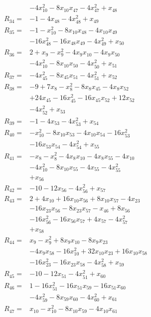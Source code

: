 \begin{align*}
&-4x_{10}^{2} -8x_{10}x_{47} -4x_{47}^{2} +x_{48}\\[3pt]
R_{34}={}&-1 -4x_{48} -4x_{48}^{2} +x_{49}\\[3pt]
R_{35}={}&-1 -x_{10}^{2} -8x_{10}x_{48} -4x_{10}x_{49}\\
&-16x_{48}^{2} -16x_{48}x_{49} -4x_{49}^{2} +x_{50}\\[3pt]
R_{36}={}&2 +x_{9} -x_{9}^{2} -4x_{9}x_{10} -4x_{9}x_{50}\\
&-4x_{10}^{2} -8x_{10}x_{50} -4x_{50}^{2} +x_{51}\\[3pt]
R_{37}={}&-4x_{45}^{2} -8x_{45}x_{51} -4x_{51}^{2} +x_{52}\\[3pt]
R_{38}={}&-9 +7x_{8} -x_{8}^{2} -8x_{8}x_{45} -4x_{8}x_{52}\\
&+24x_{45} -16x_{45}^{2} -16x_{45}x_{52} +12x_{52}\\
&-4x_{52}^{2} +x_{53}\\[3pt]
R_{39}={}&-1 -4x_{53} -4x_{53}^{2} +x_{54}\\[3pt]
R_{40}={}&-x_{10}^{2} -8x_{10}x_{53} -4x_{10}x_{54} -16x_{53}^{2}\\
&-16x_{53}x_{54} -4x_{54}^{2} +x_{55}\\[3pt]
R_{41}={}&-x_{8} -x_{8}^{2} -4x_{8}x_{10} -4x_{8}x_{55} -4x_{10}\\
&-4x_{10}^{2} -8x_{10}x_{55} -4x_{55} -4x_{55}^{2}\\
&+x_{56}\\[3pt]
R_{42}={}&-10 -12x_{56} -4x_{56}^{2} +x_{57}\\[3pt]
R_{43}={}&2 +4x_{10} +16x_{10}x_{56} +8x_{10}x_{57} -4x_{23}\\
&-16x_{23}x_{56} -8x_{23}x_{57} -x_{46} +8x_{56}\\
&-16x_{56}^{2} -16x_{56}x_{57} +4x_{57} -4x_{57}^{2}\\
&+x_{58}\\[3pt]
R_{44}={}&x_{9} -x_{9}^{2} +8x_{9}x_{10} -8x_{9}x_{23}\\
&-4x_{9}x_{58} -16x_{10}^{2} +32x_{10}x_{23} +16x_{10}x_{58}\\
&-16x_{23}^{2} -16x_{23}x_{58} -4x_{58}^{2} +x_{59}\\[3pt]
R_{45}={}&-10 -12x_{51} -4x_{51}^{2} +x_{60}\\[3pt]
R_{46}={}&1 -16x_{51}^{2} -16x_{51}x_{59} -16x_{51}x_{60}\\
&-4x_{59}^{2} -8x_{59}x_{60} -4x_{60}^{2} +x_{61}\\[3pt]
R_{47}={}&x_{10} -x_{10}^{2} -8x_{10}x_{59} -4x_{10}x_{61}\\

\end{align*}
